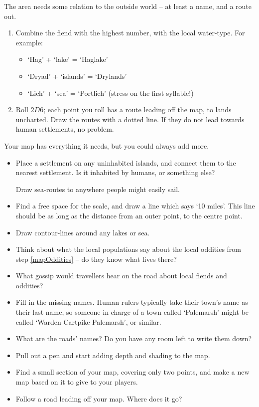 \begin{multicols}{2}

The area needs some relation to the outside world -- at least a name, and a route out.

\begin{enumerate}
  \item
  Combine the fiend with the highest number, with the local water-type.
  For example:
  \begin{itemize}
  \item
    `Hag' + `lake' = `Haglake'
  \item
    `Dryad' + `islands' = `Drylands'
  \item
    `Lich' + `sea' = `Portlich' (stress on the first syllable!)
  \end{itemize}

  \item
  Roll $2D6$; each point you roll has a route leading off the map, to lands uncharted.
  Draw the routes with a dotted line.
  If they do not lead towards human settlements, no problem.
\end{enumerate}


Your map has everything it needs, but you could always add more.

\begin{itemize}
  \item
  Place a settlement on any uninhabited islands, and connect them to the nearest settlement.
  Is it inhabited by humans, or something else?

  Draw sea-routes to anywhere people might easily sail.
  \item
  Find a free space for the scale, and draw a line which says `10 miles'.
  This line should be as long as the distance from an outer point, to the centre point.
  \item
  Draw contour-lines around any lakes or sea.
  \item
  Think about what the local populations say about the local oddities from step \ref{mapOddities} -- do they know what lives there?
  \item
  What gossip would travellers hear on the road about local fiends and oddities?
  \item
  Fill in the missing names.
  Human rulers typically take their town's name as their last name, so someone in charge of a town called `Palemarsh' might be called  `Warden Cartpike Palemarsh', or similar.
  \item
  What are the roads' names?
  Do you have any room left to write them down?
  \item
  Pull out a pen and start adding depth and shading to the map.
  \item
  Find a small section of your map, covering only two points, and make a new map based on it to give to your players.
  \item
  Follow a road leading off your map.
  Where does it go?


\end{itemize}
\end{multicols}
